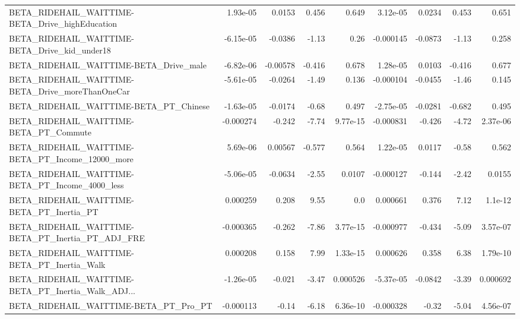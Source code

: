 \begin{tabular}{lrrrrrrrr}
BETA\_RIDEHAIL\_WAITTIME-BETA\_Drive\_highEducation    &    1.93e-05 &       0.0153 &    0.456 &    0.649 &   3.12e-05 &      0.0234 &        0.453 &         0.651 \\
BETA\_RIDEHAIL\_WAITTIME-BETA\_Drive\_kid\_under18      &   -6.15e-05 &      -0.0386 &    -1.13 &     0.26 &  -0.000145 &     -0.0873 &        -1.13 &         0.258 \\
BETA\_RIDEHAIL\_WAITTIME-BETA\_Drive\_male             &   -6.82e-06 &     -0.00578 &   -0.416 &    0.678 &   1.28e-05 &      0.0103 &       -0.416 &         0.677 \\
BETA\_RIDEHAIL\_WAITTIME-BETA\_Drive\_moreThanOneCar   &   -5.61e-05 &      -0.0264 &    -1.49 &    0.136 &  -0.000104 &     -0.0455 &        -1.46 &         0.145 \\
BETA\_RIDEHAIL\_WAITTIME-BETA\_PT\_Chinese             &   -1.63e-05 &      -0.0174 &    -0.68 &    0.497 &  -2.75e-05 &     -0.0281 &       -0.682 &         0.495 \\
BETA\_RIDEHAIL\_WAITTIME-BETA\_PT\_Commute             &   -0.000274 &       -0.242 &    -7.74 & 9.77e-15 &  -0.000831 &      -0.426 &        -4.72 &      2.37e-06 \\
BETA\_RIDEHAIL\_WAITTIME-BETA\_PT\_Income\_12000\_more   &    5.69e-06 &      0.00567 &   -0.577 &    0.564 &   1.22e-05 &      0.0117 &        -0.58 &         0.562 \\
BETA\_RIDEHAIL\_WAITTIME-BETA\_PT\_Income\_4000\_less    &   -5.06e-05 &      -0.0634 &    -2.55 &   0.0107 &  -0.000127 &      -0.144 &        -2.42 &        0.0155 \\
BETA\_RIDEHAIL\_WAITTIME-BETA\_PT\_Inertia\_PT          &    0.000259 &        0.208 &     9.55 &      0.0 &   0.000661 &       0.376 &         7.12 &       1.1e-12 \\
BETA\_RIDEHAIL\_WAITTIME-BETA\_PT\_Inertia\_PT\_ADJ\_FRE  &   -0.000365 &       -0.262 &    -7.86 & 3.77e-15 &  -0.000977 &      -0.434 &        -5.09 &      3.57e-07 \\
BETA\_RIDEHAIL\_WAITTIME-BETA\_PT\_Inertia\_Walk        &    0.000208 &        0.158 &     7.99 & 1.33e-15 &   0.000626 &       0.358 &         6.38 &      1.79e-10 \\
BETA\_RIDEHAIL\_WAITTIME-BETA\_PT\_Inertia\_Walk\_ADJ... &   -1.26e-05 &       -0.021 &    -3.47 & 0.000526 &  -5.37e-05 &     -0.0842 &        -3.39 &      0.000692 \\
BETA\_RIDEHAIL\_WAITTIME-BETA\_PT\_Pro\_PT              &   -0.000113 &        -0.14 &    -6.18 & 6.36e-10 &  -0.000328 &       -0.32 &        -5.04 &      4.56e-07 \\

\end{tabular}
